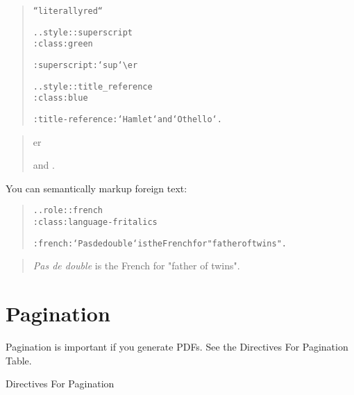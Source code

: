 \documentclass[a5paper]{book}
\begin{document}
\begin{german}
\begin{quote}
\begin{alltt}
``literally red``

.. style:: superscript
   :class: green

:superscript:`sup`\textbackslash{} er

.. style:: title\_reference
   :class: blue

:title-reference:`Hamlet` and `Othello`.
\end{alltt}
\end{quote}

\begin{quotation}\noindent
\begin{container}
{}\par

\textsuperscript{{}}er\par

{} and {}.\par
\end{container}
\end{quotation}

{\noindent}You can semantically markup foreign text:\par

\begin{quote}
\begin{alltt}
.. role:: french
   :class: language-fr italics

:french:`Pas de double` is the French for "father of twins".
\end{alltt}
\end{quote}

\begin{quotation}\noindent
\begin{container}
\textfrench{{\itshape{Pas de double}}} is the French for "father of twins".\par
\end{container}
\end{quotation}

%
\label{pagination}%
\hypertarget{pagination}{}%
%
\section*{{\noindent}Pagination}


Pagination is important if you generate PDFs. See the Directives For
Pagination Table.\par

\begin{table}[htbp]
\label{table-51}%
\hypertarget{table-51}{}%
\footnotesize
\begin{center}
\caption{Directives For Pagination}




\end{center}
\end{table}
\end{german}
\end{document}

